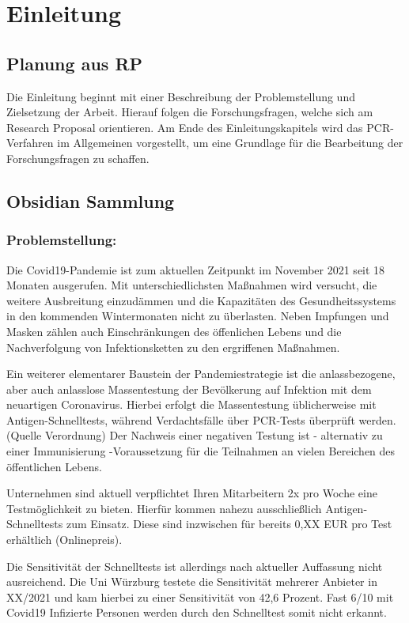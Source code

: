 \chapter{Einleitung}

\section{Planung aus RP}
Die Einleitung beginnt mit einer Beschreibung der Problemstellung und Zielsetzung der Arbeit.
Hierauf folgen die Forschungsfragen, welche sich am Research Proposal orientieren.
Am Ende des Einleitungskapitels wird das PCR-Verfahren im Allgemeinen vorgestellt, um eine Grundlage für die Bearbeitung der Forschungsfragen zu schaffen.

\section{Obsidian Sammlung}
\subsection{Problemstellung:}
Die Covid19-Pandemie ist zum aktuellen Zeitpunkt im November 2021 seit 18 Monaten ausgerufen. Mit unterschiedlichsten Maßnahmen wird versucht, die weitere Ausbreitung einzudämmen und die Kapazitäten des Gesundheitssystems in den kommenden Wintermonaten nicht zu überlasten. Neben Impfungen und Masken zählen auch Einschränkungen des öffenlichen Lebens und die Nachverfolgung von Infektionsketten zu den ergriffenen Maßnahmen.

Ein weiterer elementarer Baustein der Pandemiestrategie ist die anlassbezogene, aber auch anlasslose Massentestung der Bevölkerung auf Infektion mit dem neuartigen Coronavirus. Hierbei erfolgt die Massentestung üblicherweise mit Antigen-Schnelltests, während Verdachtsfälle über PCR-Tests überprüft werden. (Quelle Verordnung) Der Nachweis einer negativen Testung ist - alternativ zu einer Immunisierung -Voraussetzung für die Teilnahmen an vielen Bereichen des öffentlichen Lebens.

Unternehmen sind aktuell verpflichtet Ihren Mitarbeitern 2x pro Woche eine Testmöglichkeit zu bieten. Hierfür kommen nahezu ausschließlich Antigen-Schnelltests zum Einsatz. Diese sind inzwischen für bereits 0,XX EUR pro Test erhältlich (Onlinepreis).

Die Sensitivität der Schnelltests ist allerdings nach aktueller Auffassung nicht ausreichend. Die Uni Würzburg testete die Sensitivität mehrerer Anbieter in XX/2021 und kam hierbei zu einer Sensitivität von 42,6 Prozent. Fast 6/10 mit Covid19 Infizierte Personen werden durch den Schnelltest somit nicht erkannt.

